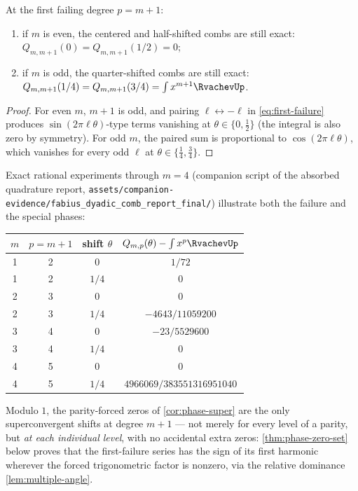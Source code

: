 \begin{corollary}
\label{cor:phase-super}
At the first failing degree $p=m+1$:
\begin{enumerate}
\item if $m$ is even, the centered and half-shifted combs are still
exact: $Q_{m,m+1}(0)=Q_{m,m+1}(1/2)=0$;
\item if $m$ is odd, the quarter-shifted combs are still exact:
$Q_{m,m+1}(1/4)=Q_{m,m+1}(3/4)
=\int x^{m+1}\RvachevUp$.
\end{enumerate}
\end{corollary}

\begin{proof}
For even $m$, $m+1$ is odd, and pairing $\ell\leftrightarrow-\ell$ in
\eqref{eq:first-failure} produces $\sin(2\pi\ell\theta)$-type terms
vanishing at $\theta\in\{0,\tfrac12\}$ (the integral is also zero by
symmetry).  For odd $m$, the paired sum is proportional to
$\cos(2\pi\ell\theta)$, which vanishes for every odd $\ell$ at
$\theta\in\{\tfrac14,\tfrac34\}$.
\end{proof}

Exact rational experiments through $m=4$ (companion script of the
absorbed quadrature report,
\nolinkurl{assets/companion-evidence/fabius_dyadic_comb_report_final/}) illustrate both
the failure and the special phases:

\begin{center}
\small
\begin{tabular}{c c c c}
\toprule
$m$ & $p=m+1$ & shift $\theta$ & $Q_{m,p}(\theta)-\int x^{p}\RvachevUp$ \\
\midrule
1 & 2 & $0$ & $1/72$ \\
1 & 2 & $1/4$ & $0$ \\
2 & 3 & $0$ & $0$ \\
2 & 3 & $1/4$ & $-4643/11059200$ \\
3 & 4 & $0$ & $-23/5529600$ \\
3 & 4 & $1/4$ & $0$ \\
4 & 5 & $0$ & $0$ \\
4 & 5 & $1/4$ & $4966069/383551316951040$ \\
\bottomrule
\end{tabular}
\label{tab:phase-super}
\end{center}

\begin{remark}
\label{conj:phase-classification}
Modulo $1$, the parity-forced zeros of \cref{cor:phase-super} are the
only superconvergent shifts at degree $m+1$ --- not merely for every
level of a parity, but \emph{at each individual level}, with no
accidental extra zeros: \cref{thm:phase-zero-set} below proves that
the first-failure series has the sign of its first harmonic wherever
the forced trigonometric factor is nonzero, via the relative
dominance \cref{lem:multiple-angle}.
\end{remark}

